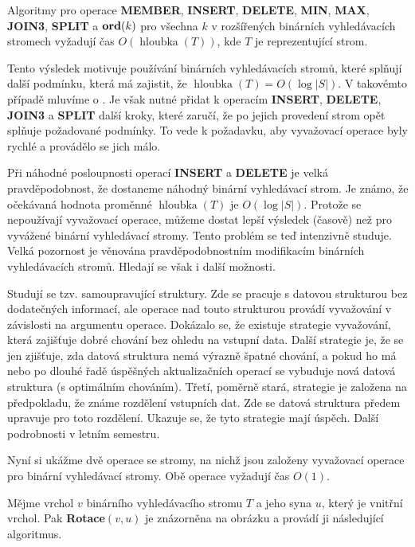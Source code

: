 \documentclass[a4paper,12pt]{article}
\def \emph#1{\underbar{#1}}
\DeclareMathOperator*{\hloubka}{hloubka}
\begin{document}
Algoritmy pro operace {\bf MEMBER}, {\bf INSERT}, {\bf DE\-LE\-TE}, {\bf MIN}, {\bf MAX}, 
{\bf JOIN3}, {\bf SPLIT} a $\bold o\bold r\bold d(k)$ pro všechna $
k$ v rozšířených binár\-ních 
vy\-hledávacích stromech vyžadují čas $O(\hloubka
(T))$, kde $T$ je 
reprezentující strom. 
\endproclaim

Tento výsledek motivuje používání binárních 
vyhledávacích stromů, které splňují další 
podmínku, která má zajistit, že 
$\hloubka(T)=O(\log|S|)$.  V takovémto případě mluvíme o 
\emph{vyvážených} \emph{binárních} 
\emph{vyhledávacích} \emph{stromech}.  Je však nutné 
přidat k ope\-racím {\bf INSERT}, {\bf DELETE}, {\bf JOIN3} a {\bf SPLIT} další 
kroky, které 
zaručí, že po jejich provedení strom opět splňuje 
požadované podmínky.  To vede k požadavku, aby 
vyvažovací operace byly rychlé a provádělo se jich málo.  

Při náhodné posloupnosti operací {\bf INSERT} a {\bf DELETE} je 
velká pravděpodobnost, že dostaneme náhodný binární 
vy\-hledávací strom.  Je známo, že očekávaná hodnota proměn\-né 
$\hloubka(T)$ je $O(\log|S|)$.  Protože se nepoužívají vyvažovací 
operace, můžeme dostat lepší výsledek (časově) než pro 
vyvá\-žené binár\-ní vyhledávací stromy.  Tento problém se teď 
intenzivně studu\-je.  Velká pozornost je věnována 
pravděpodobnost\-ním modifikacím binárních vyhledávacích 
stromů.  Hledají se však i další možnosti.  

Studují se tzv.  samoupravující struktury.  Zde se 
pracuje s datovou strukturou bez dodatečných informací, ale 
operace nad touto strukturou provádí vyvažování v závislosti 
na argumentu operace.  Dokázalo se, že existuje strategie 
vyvažování, která zajišťuje dobré chování bez ohledu na 
vstupní data.  Další strategie je, že se jen zjišťuje, zda datová 
struktura nemá výraz\-ně špatné chování, a pokud ho má nebo 
po dlouhé řadě úspěš\-ných aktualizačních operací se vybuduje 
nová datová struktura (s optimálním chováním).  Třetí, 
poměrně stará, strategie je zalo\-že\-na na předpokladu, že 
známe rozdělení vstupních dat.  Zde se datová struktura 
předem upravuje pro toto rozdělení.  Ukazuje se, že tyto 
strategie mají úspěch.  Další podrobnosti v letním semestru.  

Nyní si ukážme dvě operace se stromy, na nichž jsou 
založeny  vyvažovací operace pro binární vyhledávací 
stromy. Obě ope\-race vyžadují čas $O(1)$.

Mějme vrchol $v$ binárního vyhledávacího stromu $
T$ a 
jeho syna $u$, který je vnitřní vrchol.  Pak {\bf Rotace$
(v,u)$} je 
znázorněna na obrázku a provádí ji následující algoritmus.  
\end{document}
